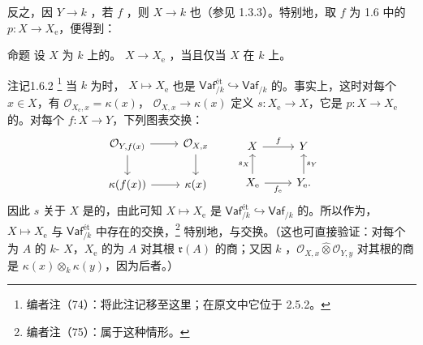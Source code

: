 反之，因 $Y\to k$ ，若 $f$ ，则 $X\to k$ 也（参见 1.3.3）。特别地，取 $f$ 为 1.6 中的 $p:X\to X_{\mathrm e}$，便得到：
\begin{SGAresult}{命题}{}
设 $X$ 为 $k$ 上的。 $X\to X_{\mathrm e}$ ，当且仅当 $X$ 在 $k$ 上。
\end{SGAresult}
\begin{SGAresult}{注记}{1.6.2}
\footnote{编者注（74）：将此注记移至这里；在原文中它位于 2.5.2。}
当 $k$ 为时， $X\mapsto X_{\mathrm e}$ 也是 $\mathsf{Vaf}^{\text{ét}}_{/k}\hookrightarrow\mathsf{Vaf}_{/k}$ 的。事实上，这时对每个 $x\in X$，有 $\mathcal O_{X_{\mathrm e},x}=\kappa(x)$， $\mathcal O_{X,x}\to\kappa(x)$ 定义 $s:X_{\mathrm e}\to X$，它是 $p:X\to X_{\mathrm e}$ 的。对每个 $f:X\to Y$，下列图表交换：
\[
\begin{tikzcd}
 \mathcal O_{Y,f(x)}\arrow[r]\arrow[d]&\mathcal O_{X,x}\arrow[d]\\
 \kappa(f(x))\arrow[r]&\kappa(x)
\end{tikzcd}
\qquad
\begin{tikzcd}
 X\arrow[r,"f"]&Y\\
 X_{\mathrm e}\arrow[r,"f_{\mathrm e}"']\arrow[u,"s_X"]&Y_{\mathrm e}\arrow[u,"s_Y"'].
\end{tikzcd}
\]
因此 $s$ 关于 $X$ 是的，由此可知 $X\mapsto X_{\mathrm e}$ 是 $\mathsf{Vaf}^{\text{ét}}_{/k}\hookrightarrow\mathsf{Vaf}_{/k}$ 的。所以作为，$X\mapsto X_{\mathrm e}$ 与 $\mathsf{Vaf}^{\text{ét}}_{/k}$ 中存在的交换，\footnote{编者注（75）：属于这种情形。} 特别地，与交换。（这也可直接验证：对每个为 $A$ 的 $k$- $X$，$X_{\mathrm e}$ 的为 $A$ 对其根 $\mathfrak r(A)$ 的商；又因 $k$ ，$\mathcal O_{X,x}\widehat\otimes\mathcal O_{Y,y}$ 对其根的商是 $\kappa(x)\otimes_k\kappa(y)$，因为后者。）
\end{SGAresult}
